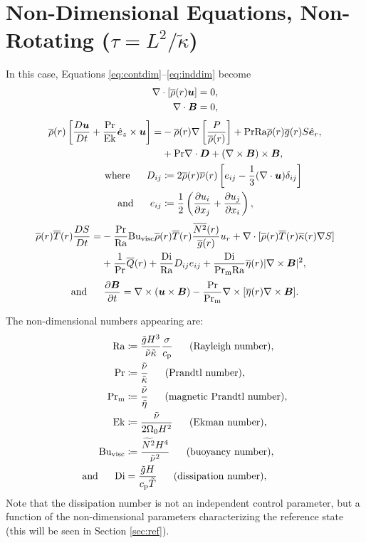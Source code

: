\documentclass[12pt]{article}
\numberwithin{equation}{section}
\begin{document}
	\section{Non-Dimensional Equations, Non-Rotating ($\tau=L^2/\tilde{\kappa}$)}
	In this case, Equations \eqref{eq:contdim}--\eqref{eq:inddim} become 
	\begin{align}
	\nabla\cdot[\overline{\rho}(r)\bm{u}] &= 0\label{eq:contndvisc},\\
	\nabla\cdot \bm{B} &= 0,
\end{align}
\begin{subequations}\label{eq:momndvisc}
	\begin{align}
		\overline{\rho}(r)\left[\frac{D\bm{u}}{Dt}+\frac{{\rm{Pr}}}{{\rm{Ek}}}\hat{\bm{e}}_z\times\bm{u}\right] = &-\overline{\rho}(r)\nabla\left[ \frac{P}{\overline{\rho}(r)} \right] + {\rm{Pr}}{\rm{Ra}}\overline{\rho}(r)\overline{g}(r) S\hat{\bm{e}}_r, \nonumber\\
		&+{\rm{Pr}}\nabla\cdot\bm{D} +(\nabla\times\bm{B})\times\bm{B},\\
		\text{where}\ \ \ \ \  D_{ij} &\coloneqq 2\overline{\rho}(r)\overline{\nu}(r) \left[e_{ij} - \frac{1}{3}(\nabla\cdot\bm{u}) \delta_{ij} \right]\\
		\text{and}\ \ \ \ \  e_{ij} &\coloneqq \frac{1}{2}\left(\frac{\partial u_i}{\partial x_j} + \frac{\partial u_j}{\partial x_i} \right),
	\end{align}
\end{subequations}
\begin{align}\label{eq:enndvisc}
	\overline{\rho}(r)\overline{T}(r) \frac{DS}{Dt} = &- \frac{{\rm{Pr}}}{{\rm{Ra}}}{\rm{Bu_{visc}}}\overline{\rho}(r)\overline{T}(r) \frac{\overline{N^2}(r)}{\overline{g}(r)} u_r + \nabla\cdot[\overline{\rho}(r) \overline{T}(r) \overline{\kappa}(r) \nabla S] \nonumber \\
	&+ \frac{1}{{\rm{Pr}}} \overline{Q}(r) + \frac{{\rm{Di}}}{{\rm{Ra}}} D_{ij}e_{ij} + \frac{{\rm{Di}}}{{\rm{Pr_m}}{\rm{Ra}}} \overline{\eta}(r)|\nabla\times\bm{B}|^2,
\end{align}
\begin{align}\label{eq:indndvisc}
	\text{and}\ \ \ \ \  \frac{\partial\bm{B}}{\partial t} = \nabla\times(\bm{u}\times\bm{B}) - \frac{{\rm{Pr}}}{{\rm{Pr_m}}} \nabla\times[\overline{\eta}(r)\nabla\times\bm{B}].
\end{align}	

The non-dimensional numbers appearing are:
\begin{subequations}
\begin{align}
	{\rm{Ra}} &\coloneqq \frac{\tilde{g} H^3}{\tilde{\nu} \tilde{\kappa}} \frac{\sigma}{c_{\rm{p}}}\ \ \ \ \ \text{(Rayleigh number)},\\ 
	{\rm{Pr}} &\coloneqq \frac{\tilde{\nu}}{\tilde{\kappa}}\ \ \ \ \ \text{(Prandtl number)},\\
	{\rm{Pr_m}} &\coloneqq \frac{\tilde{\nu}}{\tilde{\eta}}\ \ \ \ \ \text{(magnetic Prandtl number)},\\
	{\rm{Ek}} &\coloneqq \frac{\tilde{\nu}}{2\Omega_0H^2}\ \ \ \ \ \text{(Ekman number)},\\	
	{\rm{Bu_{visc}}} &\coloneqq \frac{\widetilde{N^2}H^4}{\tilde{\nu}^2}\ \ \ \ \ \text{(buoyancy number)},\\
	\text{and}\ \ \ \ \  {\rm{Di}} &= \frac{\tilde{g}H}{c_{\rm{p}}\tilde{T}}\ \ \ \ \ \text{(dissipation number)},
\end{align}
\end{subequations}
Note that the dissipation number is not an independent control parameter, but a function of the non-dimensional parameters characterizing the reference state (this will be seen in Section \ref{sec:ref}). 
\end{document}
